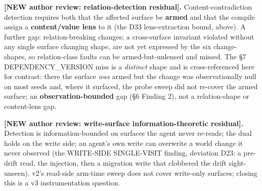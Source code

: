 \documentclass[acmsmall,screen,review,anonymous]{acmart}
\renewenvironment{leftbar}{%
  \def\FrameCommand{\hspace{2pt}{\color{lbcol}\vrule width 1.5pt}\hspace{8pt}}%
  \MakeFramed{\advance\hsize-\width \FrameRestore}\small}%
  {\endMakeFramed}
\begin{document}
\begin{leftbar}
\textbf{[NEW \textperiodcentered{} author review: relation-detection residual].} Content-contradiction detection requires both that the affected surface be \textbf{armed} and that the compile assign a \textbf{content/value lens} to it (the D33 lens-extraction bound, above). A further gap: relation-breaking changes; a cross-surface invariant violated without any single surface changing shape, are not yet expressed by the six change-shapes, so relation-class faults can be armed-but-unlensed and missed. The \S7 DEPENDENCY\_VERSION miss is a \emph{distinct} shape and is cross-referenced here for contrast: there the surface \emph{was} armed but the change was observationally null on most seeds and, where it surfaced, the probe sweep did not re-cover the armed surface; an \textbf{observation-bounded} gap (\S6 Finding 2), not a relation-shape or content-lens gap.

\textbf{[NEW \textperiodcentered{} author review: write-surface information-theoretic residual].} Detection is information-bounded on surfaces the agent never re-reads; the dual holds on the write side; an agent's own write can overwrite a world change it never observed (the WRITE-SIDE SINGLE-VISIT finding, deviation D23: a pre-drift read, the injection, then a migration write that clobbered the drift sight-unseen). v2's read-side arm-time sweep does not cover write-only surfaces; closing this is a v3 instrumentation question.

\end{leftbar}
\end{document}
